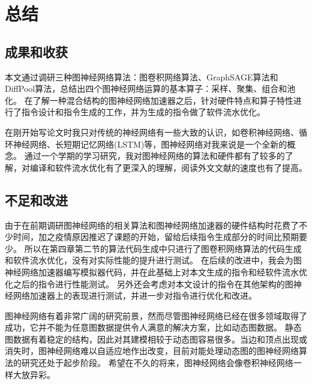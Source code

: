 
\chapter{总结}

\section{成果和收获}
本文通过调研三种图神经网络算法：图卷积网络算法、GraphSAGE算法和DiffPool算法，总结出四个图神经网络运算的基本算子：采样、聚集、组合和池化。
在了解一种混合结构的图神经网络加速器之后，针对硬件特点和算子特性进行了指令设计和指令生成的工作，并为生成的指令做了软件流水优化。

在刚开始写论文时我只对传统的神经网络有一些大致的认识，如卷积神经网络、循环神经网络、长短期记忆网络(LSTM)等，图神经网络对我来说是一个全新的概念。
通过一个学期的学习研究，我对图神经网络的算法和硬件都有了较多的了解，对编译和软件流水优化有了更深入的理解，阅读外文文献的速度也有了提高。

\section{不足和改进}
由于在前期调研图神经网络的相关算法和图神经网络加速器的硬件结构时花费了不少时间，加之疫情原因推迟了课题的开始，留给后续指令生成部分的时间比预期要少。
所以在第四章第二节的算法代码生成中只进行了图卷积网络算法的代码生成和软件流水优化，没有对实际性能的提升进行测试。
在后续的改进中，我会为图神经网络加速器编写模拟器代码，并在此基础上对本文生成的指令和经软件流水优化之后的指令进行性能测试。
另外还会考虑对本文设计的指令在其他架构的图神经网络加速器上的表现进行测试，并进一步对指令进行优化和改进。

图神经网络有着非常广阔的研究前景，然而尽管图神经网络已经在很多领域取得了成功，它并不能为任意图数据提供令人满意的解决方案，比如动态图数据。
静态图数据有着稳定的结构，因此对其建模相较于动态图容易很多。当边和顶点出现或消失时，图神经网络难以自适应地作出改变，目前对能处理动态图的图神经网络算法的研究还处于起步阶段。
希望在不久的将来，图神经网络会像卷积神经网络一样大放异彩。
